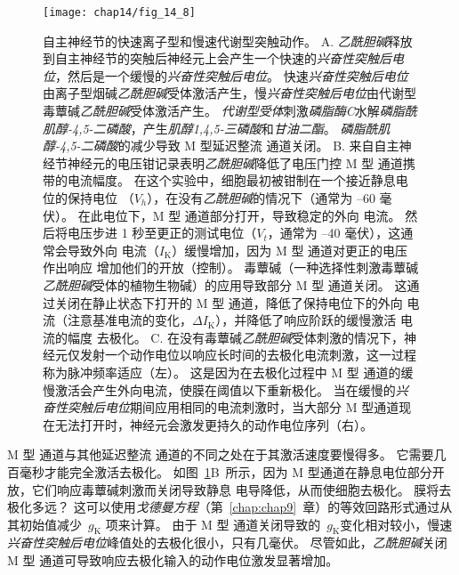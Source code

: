 \begin{figure}[htbp]
	\centering
	\texttt{[image: chap14/fig\_14\_8]}
	\caption{自主神经节的快速离子型和慢速代谢型突触动作。
		A. \textit{乙酰胆碱}释放到自主神经节的突触后神经元上会产生一个快速的\textit{兴奋性突触后电位}，然后是一个缓慢的\textit{兴奋性突触后电位}。
		快速\textit{兴奋性突触后电位}由离子型烟碱\textit{乙酰胆碱}受体激活产生，慢\textit{兴奋性突触后电位}由代谢型毒蕈碱\textit{乙酰胆碱}受体激活产生。
		\textit{代谢型受体}刺激\textit{磷脂酶C}水解\textit{磷脂酰肌醇-4,5-二磷酸}，产生\textit{肌醇1,4,5-三磷酸}和\textit{甘油二酯}。
		\textit{磷脂酰肌醇-4,5-二磷酸}的减少导致 M 型延迟整流  通道关闭。
		B. 来自自主神经节神经元的电压钳记录表明\textit{乙酰胆碱}降低了电压门控 M 型  通道携带的电流幅度。
		在这个实验中，细胞最初被钳制在一个接近静息电位的保持电位 （$V_h$），在没有\textit{乙酰胆碱}的情况下（通常为 –60 毫伏）。
		在此电位下，M 型  通道部分打开，导致稳定的外向  电流。
		然后将电压步进 1 秒至更正的测试电位（$V_t$，通常为 –40 毫伏），这通常会导致外向  电流（$I_\text{K}$）缓慢增加，因为 M 型  通道对更正的电压作出响应 增加他们的开放（控制）。
		毒蕈碱（一种选择性刺激毒蕈碱\textit{乙酰胆碱}受体的植物生物碱）的应用导致部分 M 型  通道关闭。
		这通过关闭在静止状态下打开的 M 型  通道，降低了保持电位下的外向  电流（注意基准电流的变化，$\Delta I_\text{K}$），并降低了响应阶跃的缓慢激活  电流的幅度 去极化\cite{adams1986slow}。
		C. 在没有毒蕈碱\textit{乙酰胆碱}受体刺激的情况下，神经元仅发射一个动作电位以响应长时间的去极化电流刺激，这一过程称为脉冲频率适应（左）。
		这是因为在去极化过程中 M 型  通道的缓慢激活会产生外向电流，使膜在阈值以下重新极化。
		当在缓慢的\textit{兴奋性突触后电位}期间应用相同的电流刺激时，当大部分 M 型通道现在无法打开时，神经元会激发更持久的动作电位序列（右）\cite{adams1986slow}。}
	\label{fig:14_8}
\end{figure}


M 型  通道与其他延迟整流  通道的不同之处在于其激活速度要慢得多。
它需要几百毫秒才能完全激活去极化。
如图~\ref{fig:14_8}B~所示，因为 M 型通道在静息电位部分开放，它们响应毒蕈碱刺激而关闭导致静息  电导降低，从而使细胞去极化。
膜将去极化多远？
这可以使用\textit{戈德曼方程}（第~\ref{chap:chap9}~章）的等效回路形式通过从其初始值减少~$g_\text{K}$ 项来计算。
由于 M 型  通道关闭导致的~$g_\text{K}$变化相对较小，慢速\textit{兴奋性突触后电位}峰值处的去极化很小，只有几毫伏。
尽管如此，\textit{乙酰胆碱}关闭 M 型  通道可导致响应去极化输入的动作电位激发显著增加。


